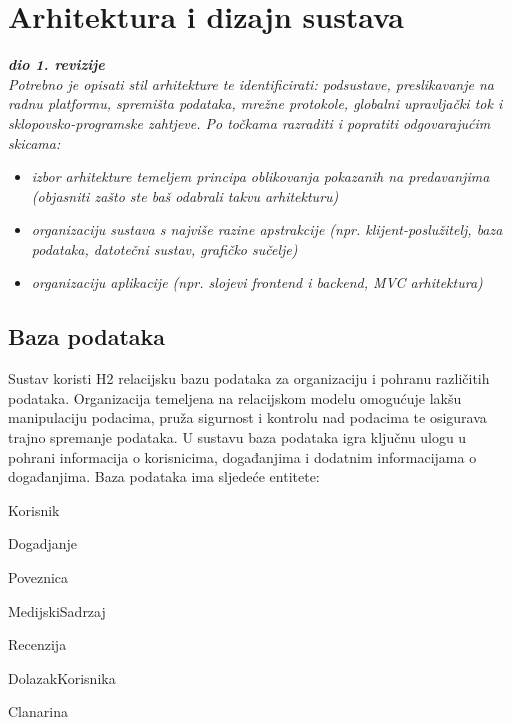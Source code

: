\chapter{Arhitektura i dizajn sustava}
		
		\textbf{\textit{dio 1. revizije}}\\

		\textit{ Potrebno je opisati stil arhitekture te identificirati: podsustave, preslikavanje na radnu platformu, spremišta podataka, mrežne protokole, globalni upravljački tok i sklopovsko-programske zahtjeve. Po točkama razraditi i popratiti odgovarajućim skicama:}
	\begin{itemize}
		\item 	\textit{izbor arhitekture temeljem principa oblikovanja pokazanih na predavanjima (objasniti zašto ste baš odabrali takvu arhitekturu)}
		\item 	\textit{organizaciju sustava s najviše razine apstrakcije (npr. klijent-poslužitelj, baza podataka, datotečni sustav, grafičko sučelje)}
		\item 	\textit{organizaciju aplikacije (npr. slojevi frontend i backend, MVC arhitektura) }		
	\end{itemize}

	
		
		\section{Baza podataka}
			
		Sustav koristi H2 relacijsku bazu podataka za organizaciju i pohranu različitih podataka. Organizacija temeljena na relacijskom modelu omogućuje lakšu manipulaciju podacima, pruža sigurnost i kontrolu nad podacima te osigurava trajno spremanje podataka. U sustavu baza podataka igra ključnu ulogu u pohrani informacija o korisnicima, događanjima i dodatnim informacijama o događanjima. Baza podataka ima sljedeće entitete:
		
		\begin{packed_item}
			\item Korisnik
			\item Dogadjanje
			\item Poveznica
			\item MedijskiSadrzaj
			\item Recenzija
			\item DolazakKorisnika
			\item Clanarina
		\end{packed_item}
		
